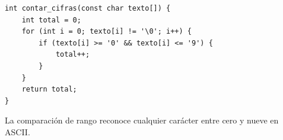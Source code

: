 \begin{enumerate}[label=\textbf{\arabic*.}]
\ifpauta\begin{solucionbox}\begin{lstlisting}[style=customc]
int contar_cifras(const char texto[]) {
    int total = 0;
    for (int i = 0; texto[i] != '\0'; i++) {
        if (texto[i] >= '0' && texto[i] <= '9') {
            total++;
        }
    }
    return total;
}
\end{lstlisting}La comparación de rango reconoce cualquier carácter entre cero y nueve en ASCII.\end{solucionbox}\else\vspace{3cm}\fi
\end{enumerate}

